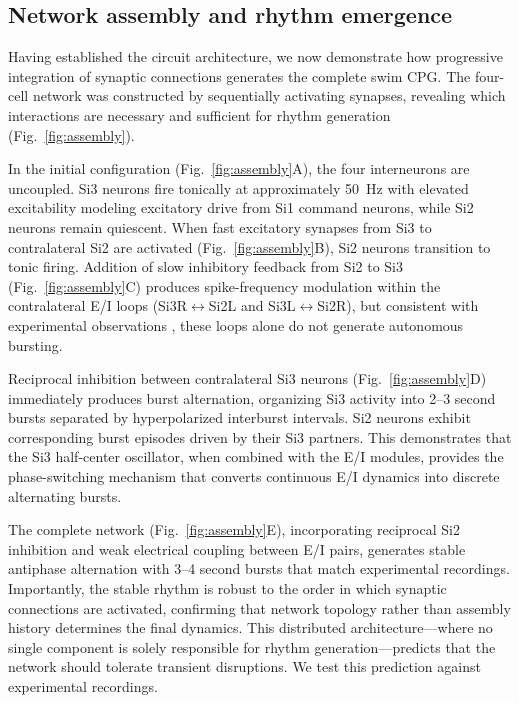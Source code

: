 \subsection{Network assembly and rhythm emergence}

Having established the circuit architecture, we now demonstrate how progressive integration of synaptic connections generates the complete swim CPG.
The four-cell network was constructed by sequentially activating synapses, revealing which interactions are necessary and sufficient for rhythm generation (Fig.~\ref{fig:assembly}).

In the initial configuration (Fig.~\ref{fig:assembly}A), the four interneurons are uncoupled.
Si3 neurons fire tonically at approximately 50~Hz with elevated excitability modeling excitatory drive from Si1 command neurons, while Si2 neurons remain quiescent.
When fast excitatory synapses from Si3 to contralateral Si2 are activated (Fig.~\ref{fig:assembly}B), Si2 neurons transition to tonic firing.
Addition of slow inhibitory feedback from Si2 to Si3 (Fig.~\ref{fig:assembly}C) produces spike-frequency modulation within the contralateral E/I loops (Si3R$\leftrightarrow$Si2L and Si3L$\leftrightarrow$Si2R), but consistent with experimental observations \cite{SakuraiKatz2016}, these loops alone do not generate autonomous bursting.

Reciprocal inhibition between contralateral Si3 neurons (Fig.~\ref{fig:assembly}D) immediately produces burst alternation, organizing Si3 activity into 2--3 second bursts separated by hyperpolarized interburst intervals.
Si2 neurons exhibit corresponding burst episodes driven by their Si3 partners.
This demonstrates that the Si3 half-center oscillator, when combined with the E/I modules, provides the phase-switching mechanism that converts continuous E/I dynamics into discrete alternating bursts.

The complete network (Fig.~\ref{fig:assembly}E), incorporating reciprocal Si2 inhibition and weak electrical coupling between E/I pairs, generates stable antiphase alternation with 3--4 second bursts that match experimental recordings.
Importantly, the stable rhythm is robust to the order in which synaptic connections are activated, confirming that network topology rather than assembly history determines the final dynamics.
This distributed architecture---where no single component is solely responsible for rhythm generation---predicts that the network should tolerate transient disruptions.
We test this prediction against experimental recordings.
